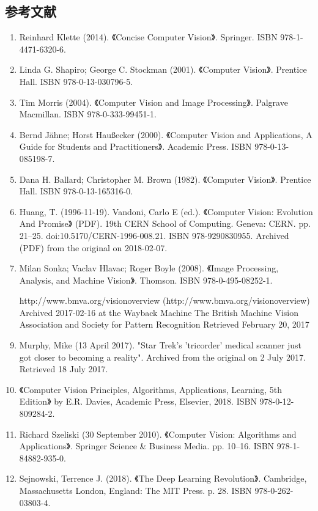 \subsection{参考文献}  
\begin{enumerate}
\item Reinhard Klette (2014). 《Concise Computer Vision》. Springer. ISBN 978-1-4471-6320-6.  
\item Linda G. Shapiro; George C. Stockman (2001). 《Computer Vision》. Prentice Hall. ISBN 978-0-13-030796-5.  
\item Tim Morris (2004). 《Computer Vision and Image Processing》. Palgrave Macmillan. ISBN 978-0-333-99451-1.  
\item Bernd Jähne; Horst Haußecker (2000). 《Computer Vision and Applications, A Guide for Students and Practitioners》. Academic Press. ISBN 978-0-13-085198-7.  
\item Dana H. Ballard; Christopher M. Brown (1982). 《Computer Vision》. Prentice Hall. ISBN 978-0-13-165316-0.  
\item Huang, T. (1996-11-19). Vandoni, Carlo E (ed.). 《Computer Vision: Evolution And Promise》 (PDF). 19th CERN School of Computing. Geneva: CERN. pp. 21–25. doi:10.5170/CERN-1996-008.21. ISBN 978-9290830955. Archived (PDF) from the original on 2018-02-07.  
\item Milan Sonka; Vaclav Hlavac; Roger Boyle (2008). 《Image Processing, Analysis, and Machine Vision》. Thomson. ISBN 978-0-495-08252-1.  
\item [http://www.bmva.org/visionoverview](http://www.bmva.org/visionoverview) Archived 2017-02-16 at the Wayback Machine The British Machine Vision Association and Society for Pattern Recognition Retrieved February 20, 2017  
\item Murphy, Mike (13 April 2017). "Star Trek's 'tricorder' medical scanner just got closer to becoming a reality". Archived from the original on 2 July 2017. Retrieved 18 July 2017.  
\item 《Computer Vision Principles, Algorithms, Applications, Learning, 5th Edition》 by E.R. Davies, Academic Press, Elsevier, 2018. ISBN 978-0-12-809284-2.  
\item Richard Szeliski (30 September 2010). 《Computer Vision: Algorithms and Applications》. Springer Science & Business Media. pp. 10–16. ISBN 978-1-84882-935-0.  
\item Sejnowski, Terrence J. (2018). 《The Deep Learning Revolution》. Cambridge, Massachusetts London, England: The MIT Press. p. 28. ISBN 978-0-262-03803-4.  

\end{enumerate}
